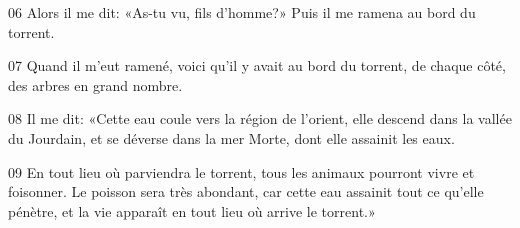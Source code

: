 
06 Alors il me dit: «As-tu vu, fils d’homme?» Puis il me ramena au bord du torrent.

07 Quand il m’eut ramené, voici qu’il y avait au bord du torrent, de chaque côté, des arbres en grand nombre.

08 Il me dit: «Cette eau coule vers la région de l’orient, elle descend dans la vallée du Jourdain, et se déverse dans la mer Morte, dont elle assainit les eaux.

09 En tout lieu où parviendra le torrent, tous les animaux pourront vivre et foisonner. Le poisson sera très abondant, car cette eau assainit tout ce qu’elle pénètre, et la vie apparaît en tout lieu où arrive le torrent.»